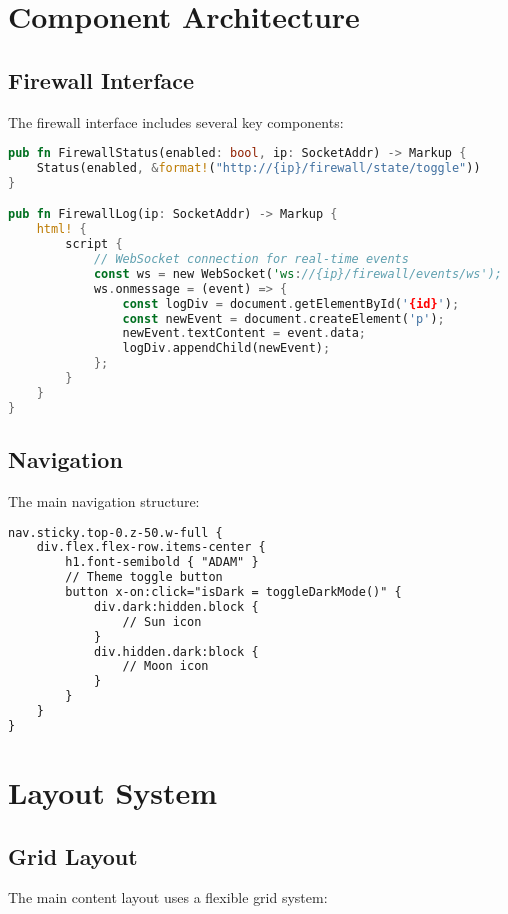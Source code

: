 \documentclass{article}
\begin{document}
\section{Component Architecture}

\subsection{Firewall Interface}
The firewall interface includes several key components:

\begin{lstlisting}[language=rust]
pub fn FirewallStatus(enabled: bool, ip: SocketAddr) -> Markup {
    Status(enabled, &format!("http://{ip}/firewall/state/toggle"))
}

pub fn FirewallLog(ip: SocketAddr) -> Markup {
    html! {
        script {
            // WebSocket connection for real-time events
            const ws = new WebSocket('ws://{ip}/firewall/events/ws');
            ws.onmessage = (event) => {
                const logDiv = document.getElementById('{id}');
                const newEvent = document.createElement('p');
                newEvent.textContent = event.data;
                logDiv.appendChild(newEvent);
            };
        }
    }
}
\end{lstlisting}

\subsection{Navigation}
The main navigation structure:

\begin{lstlisting}[language=html]
nav.sticky.top-0.z-50.w-full {
    div.flex.flex-row.items-center {
        h1.font-semibold { "ADAM" }
        // Theme toggle button
        button x-on:click="isDark = toggleDarkMode()" {
            div.dark:hidden.block {
                // Sun icon
            }
            div.hidden.dark:block {
                // Moon icon
            }
        }
    }
}
\end{lstlisting}

\section{Layout System}

\subsection{Grid Layout}
The main content layout uses a flexible grid system:
\end{document}
